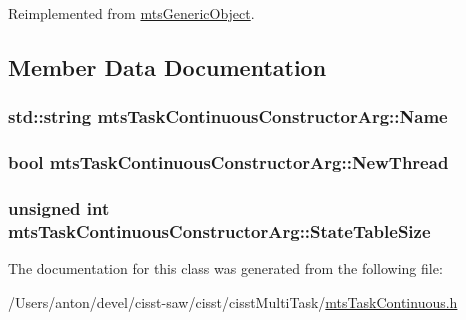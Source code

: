 Reimplemented from \hyperlink{classmts_generic_object_a4916a6c62ee5b167d7c93c88ab72523a}{mts\+Generic\+Object}.



\subsection{Member Data Documentation}
\hypertarget{classmts_task_continuous_constructor_arg_a93d1c4dea258e4b415ecfc0d4a82d379}{}
\subsubsection[{Name}]{\setlength{\rightskip}{0pt plus 5cm}std\+::string mts\+Task\+Continuous\+Constructor\+Arg\+::\+Name}\label{classmts_task_continuous_constructor_arg_a93d1c4dea258e4b415ecfc0d4a82d379}
\hypertarget{classmts_task_continuous_constructor_arg_aa49a5e6b6c0d56a38a87419604a40210}{}
\subsubsection[{New\+Thread}]{\setlength{\rightskip}{0pt plus 5cm}bool mts\+Task\+Continuous\+Constructor\+Arg\+::\+New\+Thread}\label{classmts_task_continuous_constructor_arg_aa49a5e6b6c0d56a38a87419604a40210}
\hypertarget{classmts_task_continuous_constructor_arg_a45645886b95b25b5727488c7d335b2cf}{}
\subsubsection[{State\+Table\+Size}]{\setlength{\rightskip}{0pt plus 5cm}unsigned int mts\+Task\+Continuous\+Constructor\+Arg\+::\+State\+Table\+Size}\label{classmts_task_continuous_constructor_arg_a45645886b95b25b5727488c7d335b2cf}


The documentation for this class was generated from the following file\+:\begin{DoxyCompactItemize}
\item 
/\+Users/anton/devel/cisst-\/saw/cisst/cisst\+Multi\+Task/\hyperlink{mts_task_continuous_8h}{mts\+Task\+Continuous.\+h}\end{DoxyCompactItemize}
